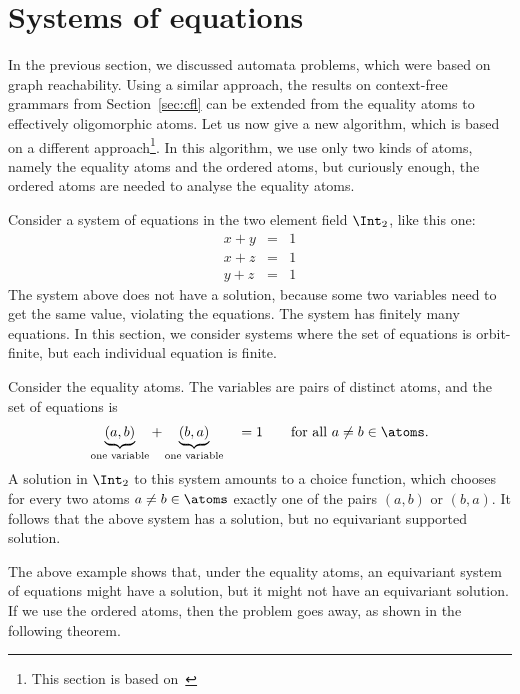 \section{Systems of equations}
\label{sec:equations-over-the two-element-field}
In the previous section, we discussed automata problems, which were based on graph reachability. Using a similar approach, the results on context-free grammars from Section~\ref{sec:cfl} can be extended from the equality atoms to effectively oligomorphic atoms. Let us now give a new algorithm, which is based on a different approach\footnote{This section is based on~\cite{klin2015locally}}. In this algorithm, we use only two kinds of atoms, namely the equality atoms and the ordered atoms, but curiously enough, the ordered atoms are needed to analyse the equality atoms. 

 Consider a system of equations in the two element field $\Int_2$, like this one:
\begin{eqnarray*}
 x + y & = & 1 \\
 x + z & = & 1 \\
 y + z & = & 1 
\end{eqnarray*}
The system above does not have a solution, because some two variables  need to get the same value, violating the equations. The system has finitely many equations. In this section, we consider systems where the set of equations is orbit-finite, but each individual equation is finite. 

\begin{myexample}
 Consider the equality atoms. The variables are pairs of distinct atoms, and the set of equations is 
 \begin{align*}
 \underbrace{(a,b)}_{\text{one variable}} + \underbrace{(b,a)}_{\text{one variable}} \quad = 1 \qquad \text{for all } a \neq b \in \atoms.
 \end{align*}
 A solution in $\Int_2$ to this system amounts to a choice function, which chooses for every two atoms $a \neq b \in \atoms$ exactly one of the pairs $(a,b)$ or $(b,a)$. It follows  that the above system has a solution, but no equivariant supported solution. 
\end{myexample}

The above example shows that, under the equality atoms, an equivariant system of equations might have a solution, but it might not have an equivariant solution. If we use the ordered atoms, then the problem goes away, as shown in the following theorem.

